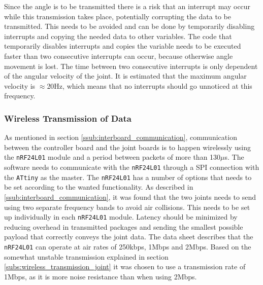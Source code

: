 Since the angle is to be transmitted there is a risk that an interrupt may occur while this transmission takes place, potentially corrupting the data to be transmitted.
This needs to be avoided and can be done by temporarily disabling interrupts and copying the needed data to other variables.
The code that temporarily disables interrupts and copies the variable needs to be executed faster than two consecutive interrupts can occur, because otherwise angle movement is lost.
The time between two consecutive interrupts is only dependent of the angular velocity of the joint.
It is estimated that the maximum angular velocity is  $\approx$20Hz, which means that no interrupts should go unnoticed at this frequency.

\subsubsection{Wireless Transmission of Data}
As mentioned in section \ref{ssub:interboard_communication}, communication between the controller board and the joint boards is to happen wirelessly using the \texttt{nRF24L01} module and a period between packets of more than 130$\mu$s.
The software needs to communicate with the \texttt{nRF24L01} through a SPI connection with the \texttt{ATtiny} as the master.
The \texttt{nRF24L01} has a number of options that needs to be set according to the wanted functionality.
As described in \ref{ssub:interboard_communication}, it was found that the two joints needs to send using two separate frequency bands to avoid air collisions. 
This needs to be set up individually in each \texttt{nRF24L01} module. 
Latency should be minimized by reducing overhead in transmitted packages and sending the smallest possible payload that correctly conveys the joint data.
The data sheet describes that the \texttt{nRF24L01} can operate at air rates of 250kbps, 1Mbps and 2Mbps.
Based on the somewhat unstable transmission explained in section \ref{subs:wireless_transmission_joint} it was chosen to use a transmission rate of 1Mbps, as it is more noise resistance than when using 2Mbps.

